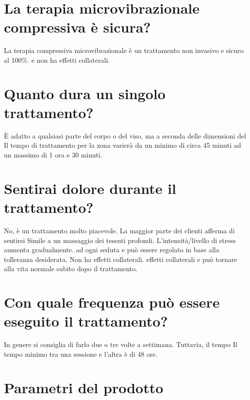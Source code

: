 \documentclass[a4paper]{article}
\begin{document}
\section{La terapia microvibrazionale compressiva è sicura?}
La terapia compressiva microvibrazionale è un trattamento non invasivo e sicuro al 100\%. e non ha effetti collaterali.

\section{Quanto dura un singolo trattamento?}
È adatto a qualsiasi parte del corpo o del viso, ma a seconda delle dimensioni del Il tempo di trattamento per la zona varierà da un minimo di circa 45 minuti ad un massimo di 1 ora e 30 minuti.

\section{Sentirai dolore durante il trattamento?}
No, è un trattamento molto piacevole. La maggior parte dei clienti afferma di sentirsi Simile a un massaggio dei tessuti profondi. L'intensità/livello di stress aumenta gradualmente. ad ogni seduta e può essere regolato in base alla tolleranza desiderata. Non ha effetti collaterali. effetti collaterali e può tornare alla vita normale subito dopo il trattamento.

\section{Con quale frequenza può essere eseguito il trattamento?}
In genere si consiglia di farlo due o tre volte a settimana. Tuttavia, il tempo Il tempo minimo tra una sessione e l'altra è di 48 ore.

\newpage

\section{Parametri del prodotto}
\end{document}
